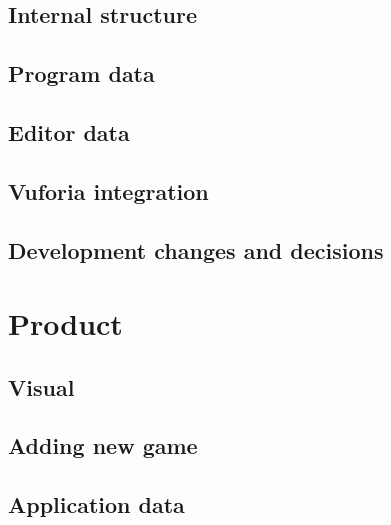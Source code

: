 \documentclass[BSP,english,oneside]{classes/gucthesis}
\begin{document}
	\newpage
	\section{Internal structure}
		\label{sec:internal_structure}
		

	\section{Program data}
		\label{sec:program_data}
		

	\newpage
	\section{Editor data}
		\label{sec:editor_data}
		

	\newpage
	\section{Vuforia integration}
		\label{sec:AR_library_integration}
		

	\section{Development changes and decisions}
		\label{sec:Developmentchangesanddecisions}
		


\chapter{Product}
	\label{chap:product}

	\section{Visual}
		\label{sec:visual}
		

	\section{Adding new game}
		\label{sec:adding_new_game}
		

	\section{Application data}
		\label{sec:application_data}
		
\end{document}

